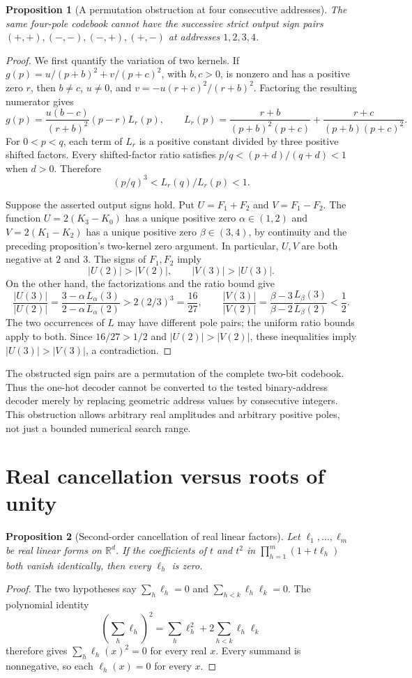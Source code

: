 \documentclass[11pt]{article}
\newtheorem{proposition}{Proposition}
\begin{document}
\begin{proposition}[A permutation obstruction at four consecutive addresses]
The same four-pole codebook cannot have the successive strict output
sign pairs $(+,+),(-,-),(-,+),(+,-)$ at addresses $1,2,3,4$.
\end{proposition}
\begin{proof}
We first quantify the variation of two kernels. If
$g(p)=u/(p+b)^2+v/(p+c)^2$, with $b,c>0$, is nonzero and has a
positive zero $r$, then $b\ne c$, $u\ne0$, and
$v=-u(r+c)^2/(r+b)^2$. Factoring the resulting numerator gives
\[
 g(p)=\frac{u(b-c)}{(r+b)^2}(p-r)L_r(p),\qquad
 L_r(p)=\frac{r+b}{(p+b)^2(p+c)}+
        \frac{r+c}{(p+b)(p+c)^2}.
\]
For $0<p<q$, each term of $L_r$ is a positive constant divided by
three positive shifted factors. Every shifted-factor ratio satisfies
$p/q<(p+d)/(q+d)<1$ when $d>0$. Therefore
\[
 (p/q)^3< L_r(q)/L_r(p)<1.
\]

Suppose the asserted output signs hold. Put $U=F_1+F_2$ and
$V=F_1-F_2$. The function $U=2(K_3-K_0)$ has a unique positive
zero $\alpha\in(1,2)$ and $V=2(K_1-K_2)$ has a unique positive
zero $\beta\in(3,4)$, by continuity and the preceding proposition's
two-kernel zero argument. In particular, $U,V$ are both negative
at $2$ and $3$. The signs of $F_1,F_2$ imply
\[
 |U(2)|>|V(2)|,\qquad |V(3)|>|U(3)|.
\]
On the other hand, the factorizations and the ratio bound give
\[
 \frac{|U(3)|}{|U(2)|}
 =\frac{3-\alpha}{2-\alpha}
   \frac{L_\alpha(3)}{L_\alpha(2)}
 >2(2/3)^3=\frac{16}{27},
 \qquad
 \frac{|V(3)|}{|V(2)|}
 =\frac{\beta-3}{\beta-2}
   \frac{L_\beta(3)}{L_\beta(2)}<\frac12.
\]
The two occurrences of $L$ may have different pole pairs; the uniform
ratio bounds apply to both. Since $16/27>1/2$ and
$|U(2)|>|V(2)|$, these inequalities imply
$|U(3)|>|V(3)|$, a contradiction.
\end{proof}

The obstructed sign pairs are a permutation of the complete two-bit
codebook. Thus the one-hot decoder cannot be converted to the tested
binary-address decoder merely by replacing geometric address values
by consecutive integers. This obstruction allows arbitrary real
amplitudes and arbitrary positive poles, not just a bounded numerical
search range.

\section{Real cancellation versus roots of unity}

\begin{proposition}[Second-order cancellation of real linear factors]
Let $\ell_1,\ldots,\ell_m$ be real linear forms on $\mathbb R^d$.
If the coefficients of $t$ and $t^2$ in
$\prod_{h=1}^m(1+t\ell_h)$ both vanish identically, then every
$\ell_h$ is zero.
\end{proposition}
\begin{proof}
The two hypotheses say $\sum_h\ell_h=0$ and
$\sum_{h<k}\ell_h\ell_k=0$. The polynomial identity
\[
 \left(\sum_h\ell_h\right)^2
 =\sum_h\ell_h^2+2\sum_{h<k}\ell_h\ell_k
\]
therefore gives $\sum_h\ell_h(x)^2=0$ for every real $x$.
Every summand is nonnegative, so each $\ell_h(x)=0$ for every $x$.
\end{proof}
\end{document}
